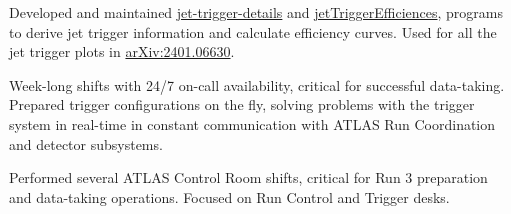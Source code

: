 
\begin{cventries}
    {Developed and maintained \href{https://gitlab.cern.ch/atlas-trigger/jet/jet-trigger-details}{jet-trigger-details} and \href{https://gitlab.cern.ch/atlas-trigger/jet/jetTriggerEfficiencies/-/tree/R22-master}{jetTriggerEfficiences}, programs to derive jet trigger information and calculate efficiency curves. Used for all the jet trigger plots in \href{https://doi.org/10.48550/arXiv.2401.06630}{arXiv:2401.06630}.}

    {Week-long shifts with 24/7 on-call availability, critical for successful data-taking. Prepared trigger configurations on the fly, solving problems with the trigger system in real-time in constant communication with ATLAS Run Coordination and detector subsystems.}

    {Performed several ATLAS Control Room shifts, critical for Run 3 preparation and data-taking operations. Focused on Run Control and Trigger desks.}

\end{cventries}